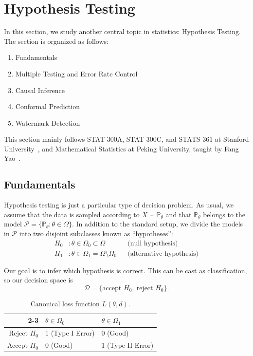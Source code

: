 \newpage
\section{Hypothesis Testing}
In this section, we study another central topic in statistics: Hypothesis Testing. The section is organized as follows: 
\begin{enumerate}
    \item Fundamentals
    \item Multiple Testing and Error Rate Control
    \item Causal Inference
    \item Conformal Prediction
    \item Watermark Detection
\end{enumerate}

This section mainly follows STAT 300A, STAT 300C, and STATS 361 at Stanford University~\cite{mackeyStanfordStats300A,candesStanfordStats300C,wagerStanfordStats361}, and Mathematical Statistics at Peking University, taught by Fang Yao~\cite{yaoPkuMathematicalStatistics}.

\subsection{Fundamentals}
Hypothesis testing is just a particular type of decision problem. As usual, we 
assume that the data is sampled according to $X \sim \mathbb{P}_\theta$ and that 
$\mathbb{P}_\theta$ belongs to the model 
$\mathcal{P} = \{\mathbb{P}_\theta : \theta \in \Omega\}$. In addition to the 
standard setup, we divide the models in $\mathcal{P}$ into two disjoint subclasses 
known as ``hypotheses'':
\[
  \begin{aligned}
    H_0 &: \theta \in \Omega_0 \subset \Omega && \text{(null hypothesis)} \\
    H_1 &: \theta \in \Omega_1 = \Omega \setminus \Omega_0 && \text{(alternative hypothesis)}
  \end{aligned}
\]

Our goal is to infer which hypothesis is correct. This can be cast as classification, 
so our decision space is
\[
  \mathcal{D} = \{\text{accept } H_0,\ \text{reject } H_0\}.
\]

\begin{table}[h]
  \centering
  \begin{tabular}{r|l|l|}
    \cline{2-3}
                                  & $\theta \in \Omega_0$  & $\theta \in \Omega_1$   \\ \hline
    \multicolumn{1}{|r|}{Reject $H_0$} & 1 (Type I Error)       & 0 (Good)                \\ \hline
    \multicolumn{1}{|r|}{Accept $H_0$} & 0 (Good)               & 1 (Type II Error)       \\ \hline
  \end{tabular}
  \caption{Canonical loss function $L(\theta, d)$.}
  \label{tab:canonical-loss}
\end{table}

